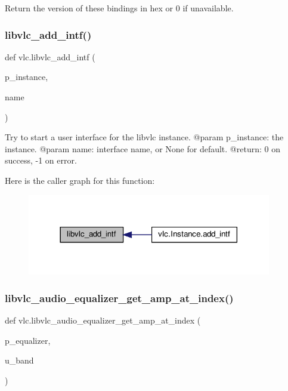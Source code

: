 \begin{DoxyVerb}Return the version of these bindings in hex or 0 if unavailable.
\end{DoxyVerb}
 \mbox{\label{namespacevlc_ab8767ae6377ad6875f5034a12a4cd409}} 
\subsubsection{\texorpdfstring{libvlc\+\_\+add\+\_\+intf()}{libvlc\_add\_intf()}}
{\footnotesize\ttfamily def vlc.\+libvlc\+\_\+add\+\_\+intf (\begin{DoxyParamCaption}\item[{}]{p\+\_\+instance,  }\item[{}]{name }\end{DoxyParamCaption})}

\begin{DoxyVerb}Try to start a user interface for the libvlc instance.
@param p_instance: the instance.
@param name: interface name, or None for default.
@return: 0 on success, -1 on error.
\end{DoxyVerb}
 Here is the caller graph for this function\+:
\nopagebreak
\begin{figure}[H]
\begin{center}
\leavevmode
\includegraphics[width=302pt]{namespacevlc_ab8767ae6377ad6875f5034a12a4cd409_icgraph}
\end{center}
\end{figure}
\mbox{\label{namespacevlc_ab14a271ab740aa688682202d8957f024}} 
\subsubsection{\texorpdfstring{libvlc\+\_\+audio\+\_\+equalizer\+\_\+get\+\_\+amp\+\_\+at\+\_\+index()}{libvlc\_audio\_equalizer\_get\_amp\_at\_index()}}
{\footnotesize\ttfamily def vlc.\+libvlc\+\_\+audio\+\_\+equalizer\+\_\+get\+\_\+amp\+\_\+at\+\_\+index (\begin{DoxyParamCaption}\item[{}]{p\+\_\+equalizer,  }\item[{}]{u\+\_\+band }\end{DoxyParamCaption})}

